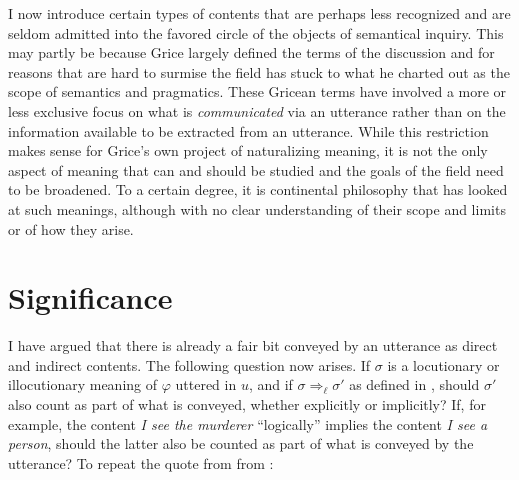 %
%
%
%
%
%
%
%

I now introduce certain types of contents that are perhaps less recognized and are seldom admitted into the favored circle of the objects of semantical inquiry. This may partly be because Grice largely defined the terms of the discussion and for reasons that are hard to surmise the field has stuck to what he charted out as the scope of semantics and pragmatics. These Gricean terms have involved a more or less exclusive focus on what is \emph{communicated} via an utterance rather than on the information available to be extracted from an utterance. While this restriction makes sense for Grice's own project of naturalizing meaning, it is not the only aspect of meaning that can and should be studied and the goals of the field need to be broadened. To a certain degree, it is continental philosophy that has looked at such meanings, although with no clear understanding of their scope and limits or of how they arise.


\section{Significance} \label{sec:significance}

I have argued that there is already a fair bit conveyed by an utterance as direct and indirect contents. The following question now arises. If $\sigma$ is a locutionary or illocutionary meaning of $\varphi$ uttered in $u$, and if $\sigma \Rightarrow_{\ell} \sigma'$ as defined in , should $\sigma'$ also count as part of what is conveyed, whether explicitly or implicitly? If, for example, the content \emph{I see the murderer} ``logically'' implies the content \emph{I see a person}, should the latter also be counted as part of what is conveyed by the utterance? To repeat the quote from \citet[p. 349]{thomason:ami} from :


